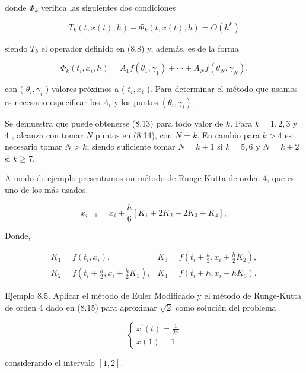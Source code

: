 \documentclass[10pt]{book}
\begin{document}
donde $\Phi_{k}$ verifica las siguientes dos condiciones


\begin{equation*}
T_{k}(t, x(t), h)-\Phi_{k}(t, x(t), h)=O\left(h^{k}\right) \tag{8.13}
\end{equation*}


siendo $T_{k}$ el operador definido en (8.8) y, además, es de la forma


\begin{equation*}
\Phi_{k}\left(t_{i}, x_{i}, h\right)=A_{1} f\left(\theta_{1}, \gamma_{1}\right)+\cdots+A_{N} f\left(\theta_{N}, \gamma_{N}\right) . \tag{8.14}
\end{equation*}


con ( $\theta_{i}, \gamma_{i}$ ) valores próximos a ( $t_{i}, x_{i}$ ). Para determinar el método que usamos es necesario especificar los $A_{i}$ y los puntos $\left(\theta_{i}, \gamma_{i}\right)$.

Se demuestra que puede obtenerse (8.13) para todo valor de $k$. Para $k=1,2,3$ y 4 , alcanza con tomar $N$ puntos en (8.14), con $N=k$. En cambio para $k>4$ es necesario tomar $N>k$, siendo suficiente tomar $N=k+1$ si $k=5,6$ y $N=k+2$ si $k \geq 7$.

A modo de ejemplo presentamos un método de Runge-Kutta de orden 4, que es uno de los más usados.


\begin{equation*}
x_{i+1}=x_{i}+\frac{h}{6}\left[K_{1}+2 K_{2}+2 K_{3}+K_{4}\right], \tag{8.15}
\end{equation*}


Donde,

$$
\begin{array}{ll}
K_{1}=f\left(t_{i}, x_{i}\right), & K_{3}=f\left(t_{i}+\frac{h}{2}, x_{i}+\frac{h}{2} K_{2}\right), \\
K_{2}=f\left(t_{i}+\frac{h}{2}, x_{i}+\frac{h}{2} K_{1}\right), & K_{4}=f\left(t_{i}+h, x_{i}+h K_{3}\right) .
\end{array}
$$

Ejemplo 8.5. Aplicar el método de Euler Modificado y el método de Runge-Kutta de orden 4 dado en (8.15) para aproximar $\sqrt{2}$ como solución del problema

$$
\left\{\begin{array}{l}
x^{\prime}(t)=\frac{1}{2 x} \\
x(1)=1
\end{array}\right.
$$

considerando el intervalo $[1,2]$.
\end{document}
